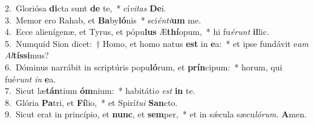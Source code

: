 {2.~}Gloriósa \textbf{di}cta sunt \textbf{de} te,~* cí\textit{vi}\textit{tas} \textbf{De}i.\\
{3.~}Memor ero Rahab, et \textbf{Ba}by\textbf{ló}nis~* sci\textit{én}\textit{ti}\textbf{um} me.\\
{4.~}Ecce alienígenæ, et Tyrus, et pópu\textbf{lus} Æ\textbf{thí}opum,~* hi fu\textit{é}\textit{runt} \textbf{il}lic.\\
{5.~}Numquid Sion dicet:~† Homo, et homo natus \textbf{est} in \textbf{e}a:~* et ipse fundávit e\textit{am} \textit{Al}\textbf{tís}\textbf{si}mus?\\
{6.~}Dóminus narrábit in scriptúris popu\textbf{ló}rum, et \textbf{prín}cipum:~* horum, qui fué\textit{runt} \textit{in} \textbf{e}a.\\
{7.~}Sicut læ\textbf{tán}tium \textbf{óm}nium:~* habitáti\textit{o} \textit{est} \textbf{in} te.\\
{8.~}Glória \textbf{Pa}tri, et \textbf{Fí}lio,~* et Spirí\textit{tu}\textit{i} \textbf{San}cto.\\
{9.~}Sicut erat in princípio, et \textbf{nunc}, et \textbf{sem}per,~* et in sǽcula sæcu\textit{ló}\textit{rum}. \textbf{A}men.\\
